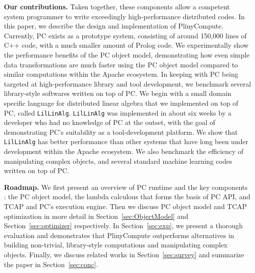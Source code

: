 \vspace{5 pt}
\noindent
\textbf{Our contributions.}
Taken together, these components allow a competent system programmer to write exceedingly high-performance distributed codes.
In this paper, we describe the design and implementation of PlinyCompute.  Currently, PC exists as a prototype system, consisting of around
150,000 lines of C++ code, with a much smaller amount of Prolog code. We experimentally show the performance benefits of the PC object model, 
demonstrating how even simple data transformations are much faster using the PC object model compared to similar computations within the 
Apache ecosystem.
In keeping with PC being targeted at high-performance
library and tool development,
we benchmark several library-style softwares written on top of PC.  We begin with a small domain specific language
for distributed linear algebra that we implemented on top of PC, called \texttt{LilLinAlg}.  \texttt{LilLinAlg} was implemented in about six weeks by a developer
who had no knowledge of PC at the outset, with the goal of demonstrating PC's suitability as a tool-development platform.  
We show that \texttt{LilLinAlg} has better performance than other systems that have long been under development
within the Apache ecosystem.   
We also benchmark the efficiency of manipulating complex objects, and
several standard machine learning codes written on top of PC.  

\vspace{5 pt}
\noindent
\textbf{Roadmap.} We first present an overview of PC runtime and the key components
: the PC object model, the lambda calculous that
forms the basis of PC API, 
and TCAP and PC's execution engine. Then we discuss PC object model
and TCAP optimization
in more detail in Section~\ref{sec:ObjectModel}  and
Section~\ref{sec:optimizer} respectively. In
Section~\ref{sec:exp}, we present a thorough 
evaluation and demonstrates that PlinyCompute outperforms alternatives
in building non-trivial, library-style computations  and manipulating
complex objects. Finally, we discuss related works in
Section~\ref{sec:survey} and summarize the paper in Section~\ref{sec:conc}.